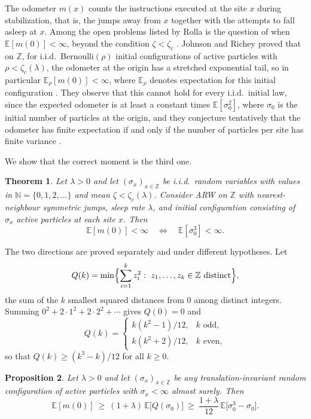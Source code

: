 \documentclass[11pt]{article}
\newtheorem{theorem}{Theorem}[section]
\newtheorem{proposition}[theorem]{Proposition}
\theoremstyle{remark}
\newcommand{\Z}{\mathbb Z}
\newcommand{\N}{\mathbb N}
\newcommand{\E}{\mathbb E}
\newcommand{\1}{\mathbf 1}
\begin{document}
The odometer $m(x)$ counts the instructions executed at the site $x$ during stabilization, that is, the jumps away from $x$ together with the attempts to fall asleep at $x$. Among the open problems listed by Rolla is the question of when $\E[m(0)]<\infty$, beyond the condition $\zeta<\zeta_c$ \cite[p.~517]{Ro}. Johnson and Richey \cite{JR} proved that on $\Z$, for i.i.d.\ Bernoulli$(\rho)$ initial configurations of active particles with $\rho<\zeta_c(\lambda)$, the odometer at the origin has a stretched exponential tail, so in particular $\E_\rho[m(0)]<\infty$, where $\E_\rho$ denotes expectation for this initial configuration \cite[Theorem~1.1 and Corollary~1.2]{JR}. They observe that this cannot hold for every i.i.d.\ initial law, since the expected odometer is at least a constant times $\E[\sigma_0^2]$, where $\sigma_0$ is the initial number of particles at the origin, and they conjecture tentatively that the odometer has finite expectation if and only if the number of particles per site has finite variance \cite[Section~1]{JR}.

We show that the correct moment is the third one.

\begin{theorem}\label{thm:main}
Let $\lambda>0$ and let $(\sigma_x)_{x\in\Z}$ be i.i.d.\ random variables with values in $\N=\{0,1,2,\dots\}$ and mean $\zeta<\zeta_c(\lambda)$. Consider ARW on $\Z$ with nearest-neighbour symmetric jumps, sleep rate $\lambda$, and initial configuration consisting of $\sigma_x$ active particles at each site $x$. Then
\[
\E[m(0)]<\infty \quad\Longleftrightarrow\quad \E[\sigma_0^3]<\infty .
\]
\end{theorem}

The two directions are proved separately and under different hypotheses. Let
\[
Q(k)=\min\Bigl\{\sum_{i=1}^k z_i^2:\ z_1,\dots,z_k\in\Z \text{ distinct}\Bigr\},
\]
the sum of the $k$ smallest squared distances from $0$ among distinct integers. Summing $0^2+2\cdot1^2+2\cdot2^2+\cdots$ gives $Q(0)=0$ and
\begin{equation}\label{eq:Q}
Q(k)=\begin{cases}
k(k^2-1)/12, & k \text{ odd},\\
k(k^2+2)/12, & k \text{ even},
\end{cases}
\end{equation}
so that $Q(k)\ge (k^3-k)/12$ for all $k\ge0$.

\begin{proposition}\label{prop:lower}
Let $\lambda>0$ and let $(\sigma_x)_{x\in\Z}$ be any translation-invariant random configuration of active particles with $\sigma_x<\infty$ almost surely. Then
\[
\E[m(0)]\ \ge\ (1+\lambda)\,\E\bigl[Q(\sigma_0)\bigr]\ \ge\ \frac{1+\lambda}{12}\,\E\bigl[\sigma_0^3-\sigma_0\bigr].
\]
\end{proposition}
\end{document}
